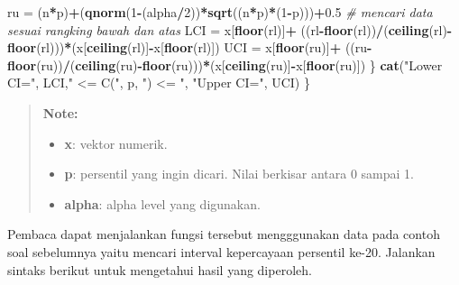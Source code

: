 \documentclass[]{book}
\newenvironment{Shaded}{\begin{snugshade}}{\end{snugshade}}
\newcommand{\KeywordTok}[1]{\textcolor[rgb]{0.13,0.29,0.53}{\textbf{#1}}}
\newcommand{\DataTypeTok}[1]{\textcolor[rgb]{0.13,0.29,0.53}{#1}}
\newcommand{\DecValTok}[1]{\textcolor[rgb]{0.00,0.00,0.81}{#1}}
\newcommand{\FloatTok}[1]{\textcolor[rgb]{0.00,0.00,0.81}{#1}}
\newcommand{\StringTok}[1]{\textcolor[rgb]{0.31,0.60,0.02}{#1}}
\newcommand{\CommentTok}[1]{\textcolor[rgb]{0.56,0.35,0.01}{\textit{#1}}}
\newcommand{\OperatorTok}[1]{\textcolor[rgb]{0.81,0.36,0.00}{\textbf{#1}}}
\newcommand{\NormalTok}[1]{#1}
\providecommand{\tightlist}{%
  \setlength{\itemsep}{0pt}\setlength{\parskip}{0pt}}
\begin{document}
\begin{Shaded}
\begin{Highlighting}[]
\NormalTok{    ru =}\StringTok{ }\NormalTok{(n}\OperatorTok{*}\NormalTok{p)}\OperatorTok{+}\NormalTok{(}\KeywordTok{qnorm}\NormalTok{(}\DecValTok{1}\OperatorTok{-}\NormalTok{(alpha}\OperatorTok{/}\DecValTok{2}\NormalTok{))}\OperatorTok{*}\KeywordTok{sqrt}\NormalTok{((n}\OperatorTok{*}\NormalTok{p)}\OperatorTok{*}\NormalTok{(}\DecValTok{1}\OperatorTok{-}\NormalTok{p)))}\OperatorTok{+}\FloatTok{0.5}
    \CommentTok{# mencari data sesuai rangking bawah dan atas}
\NormalTok{    LCI =}\StringTok{ }\NormalTok{x[}\KeywordTok{floor}\NormalTok{(rl)]}\OperatorTok{+}\StringTok{ }
\StringTok{      }\NormalTok{((rl}\OperatorTok{-}\KeywordTok{floor}\NormalTok{(rl))}\OperatorTok{/}\NormalTok{(}\KeywordTok{ceiling}\NormalTok{(rl)}\OperatorTok{-}\KeywordTok{floor}\NormalTok{(rl)))}\OperatorTok{*}\NormalTok{(x[}\KeywordTok{ceiling}\NormalTok{(rl)]}\OperatorTok{-}\NormalTok{x[}\KeywordTok{floor}\NormalTok{(rl)])}
\NormalTok{    UCI =}\StringTok{ }\NormalTok{x[}\KeywordTok{floor}\NormalTok{(ru)]}\OperatorTok{+}\StringTok{ }
\StringTok{      }\NormalTok{((ru}\OperatorTok{-}\KeywordTok{floor}\NormalTok{(ru))}\OperatorTok{/}\NormalTok{(}\KeywordTok{ceiling}\NormalTok{(ru)}\OperatorTok{-}\KeywordTok{floor}\NormalTok{(ru)))}\OperatorTok{*}\NormalTok{(x[}\KeywordTok{ceiling}\NormalTok{(ru)]}\OperatorTok{-}\NormalTok{x[}\KeywordTok{floor}\NormalTok{(ru)])}
\NormalTok{  \}}
  \KeywordTok{cat}\NormalTok{(}\StringTok{"Lower CI="}\NormalTok{, LCI,}\StringTok{" <= C("}\NormalTok{, p, }\StringTok{") <= "}\NormalTok{, }
       \StringTok{"Upper CI="}\NormalTok{, UCI)}
\NormalTok{\}}
\end{Highlighting}
\end{Shaded}

\begin{quote}
\textbf{Note: }

\begin{itemize}
\tightlist
\item
  \textbf{x}: vektor numerik.
\item
  \textbf{p}: persentil yang ingin dicari. Nilai berkisar antara 0
  sampai 1.
\item
  \textbf{alpha}: alpha level yang digunakan.
\end{itemize}
\end{quote}

Pembaca dapat menjalankan fungsi tersebut mengggunakan data pada contoh
soal sebelumnya yaitu mencari interval kepercayaan persentil ke-20.
Jalankan sintaks berikut untuk mengetahui hasil yang diperoleh.

\begin{Shaded}
\end{Shaded}
\end{document}
